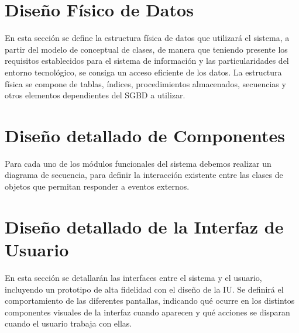 \section{Diseño Físico de Datos}
En esta sección se define la estructura física de datos que utilizará el sistema, a partir del modelo de conceptual de clases, de manera que teniendo presente los requisitos establecidos para el sistema de información y las particularidades del entorno tecnológico, se consiga un acceso eficiente de los datos.
La estructura física se compone de tablas, índices, procedimientos almacenados, secuencias y otros elementos dependientes del SGBD a utilizar.

\section{Diseño detallado de Componentes}
Para cada uno de los módulos funcionales del sistema debemos realizar un diagrama de secuencia, para definir la interacción existente entre las clases de objetos que permitan responder a eventos externos.

\section{Diseño detallado de la Interfaz de Usuario} 
En esta sección se detallarán las interfaces entre el sistema y el usuario, incluyendo un prototipo de alta fidelidad con el diseño de la IU. Se definirá el comportamiento de las diferentes pantallas, indicando qué ocurre en los distintos componentes visuales de la interfaz cuando aparecen y qué acciones se disparan cuando el usuario trabaja con ellas.

